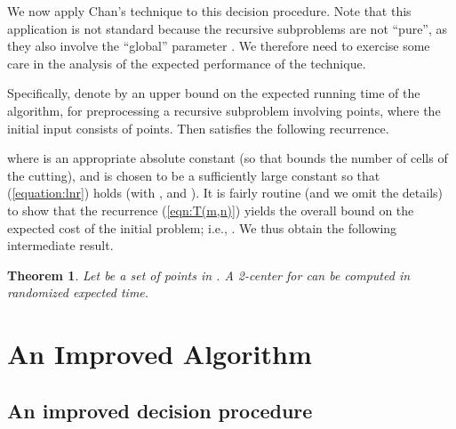 \documentclass[a4paper,12pt]{article}
\newtheorem{theorem}{Theorem}[section]
\begin{document}
We now apply Chan's technique to this decision procedure. Note that
this application is not standard because the recursive subproblems are
not ``pure'', as they also involve the ``global'' parameter . We
therefore need to exercise some care in the analysis of the expected
performance of the technique.

Specifically, denote by  an upper bound on the expected
running time of the algorithm, for preprocessing
a recursive subproblem involving  points, where the initial input
consists of  points. Then  satisfies the following recurrence.


where  is an appropriate absolute constant (so that 
bounds the number of cells of the cutting), and  is chosen
to be a sufficiently large constant so that (\ref{equation:lnr})
holds (with , and ).
It is fairly routine (and we omit the details) to show that the
recurrence (\ref{eqn:T(m,n)}) yields the overall bound  on the expected cost of the initial problem; i.e., . We thus obtain the following intermediate result.

\begin{theorem}
Let  be a set of  points in . A 2-center for 
can be computed in  randomized expected time.
\end{theorem}

\section{An Improved Algorithm}
\label{sec:improved_alg}

\subsection{An improved decision procedure }
\label{subsec:improved_decision_procedure}
\end{document}
